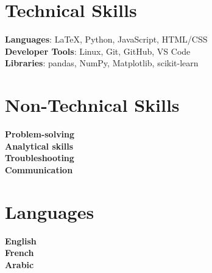 \documentclass[a4paper,11pt]{article}
\begin{document}
\section{Technical Skills}
 \begin{itemize}[leftmargin=0.15in, label={}]
    \small{\item{
     \textbf{Languages}{: LaTeX, Python, JavaScript, HTML/CSS} \\
     \textbf{Developer Tools}{: Linux, Git, GitHub, VS Code} \\
     \textbf{Libraries}{: pandas, NumPy, Matplotlib, scikit-learn}
    }}
 \end{itemize}

\section{Non-Technical Skills}
 \begin{itemize}[leftmargin=0.15in, label={}]
    \small{\item{
      \textbf{Problem-solving} \\
      \textbf{Analytical skills} \\
      \textbf{Troubleshooting} \\
      \textbf{Communication}
    }}
 \end{itemize}


\section{Languages}
 \begin{itemize}[leftmargin=0.15in, label={}]
    \small{\item{
     \textbf{English} \\
     \textbf{French} \\
     \textbf{Arabic}
    }}
 \end{itemize}
\end{document}
